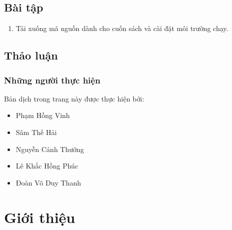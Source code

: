 \documentclass[letterpaper,11pt,english]{sphinxmanual}
\begin{document}
\section{Bài tập}
\label{\detokenize{chapter_install/index_vn:bai-tap}}

\begin{enumerate}
%
\item {} 
Tải xuống mã nguồn dành cho cuốn sách và cài đặt môi trường chạy.

\end{enumerate}




\section{Thảo luận\sphinxfootnotemark[28]}
\label{\detokenize{chapter_install/index_vn:thao-luan}}%
\begin{footnotetext}[28]\sphinxAtStartFootnote
{}
%
\end{footnotetext}\ignorespaces 


\begin{center}\end{center}




\subsection{Những người thực hiện}
\label{\detokenize{chapter_install/index_vn:nhung-nguoi-thuc-hien}}
Bản dịch trong trang này được thực hiện bởi:


\begin{itemize}
\item {} 
Phạm Hồng Vinh

\item {} 
Sâm Thế Hải

\item {} 
Nguyễn Cảnh Thướng

\item {} 
Lê Khắc Hồng Phúc

\item {} 
Đoàn Võ Duy Thanh

\end{itemize}






\chapter{Giới thiệu}
\label{\detokenize{chapter_introduction/index_vn:gioi-thieu}}\label{\detokenize{chapter_introduction/index_vn:chap-introduction}}\label{\detokenize{chapter_introduction/index_vn::doc}}
\end{document}
